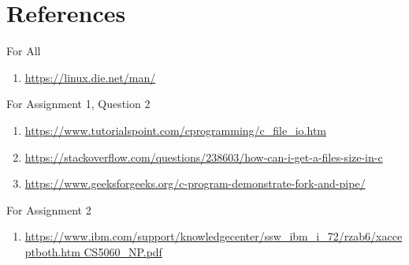 \documentclass[a4paper,12pt]{report}
\begin{document}
\section{References}
For All
\begin{enumerate}
\item \href{https://linux.die.net/man/}{https://linux.die.net/man/}
\end{enumerate}
For Assignment 1, Question 2
\begin{enumerate}
\item \href{https://www.tutorialspoint.com/cprogramming/c\_file\_io.htm
}{https://www.tutorialspoint.com/cprogramming/c\_file\_io.htm}
\item \href{https://stackoverflow.com/questions/238603/how-can-i-get-a-files-size-in-c}{https://stackoverflow.com/questions/238603/how-can-i-get-a-files-size-in-c}
\item \href{https://www.geeksforgeeks.org/c-program-demonstrate-fork-and-pipe/}{https://www.geeksforgeeks.org/c-program-demonstrate-fork-and-pipe/}
\end{enumerate}
For Assignment 2
\begin{enumerate}
\item \href{https://www.ibm.com/support/knowledgecenter/ssw\_ibm\_i\_72/rzab6/xacceptboth.htm
CS5060\_NP.pdf}{https://www.ibm.com/support/knowledgecenter/ssw\_ibm\_i\_72/rzab6/xacceptboth.htm
CS5060\_NP.pdf}
\end{enumerate}
\end{document}
